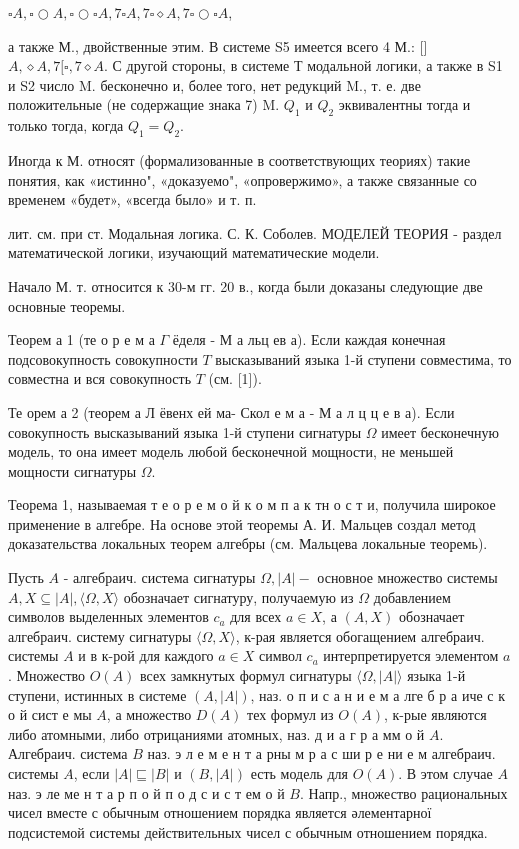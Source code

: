 \documentclass[10pt]{article}
\begin{document}
$\square A, \square \bigcirc A, \square \bigcirc \square A, 7 \square A, 7 \square \diamond A, 7 \square \bigcirc \square A$,



а также М., двойственные этим. В системе S5 имеется всего 4 М.: []$A, \diamond A, 7[\square, 7 \diamond A$. С другой стороны, в системе Т модальной логики, а также в S1 и S2 число M. бесконечно и, более того, нет редукций M., т. е. две положительные (не содержащие знака 7) M. $Q_{1}$ и $Q_{2}$ эквивалентны тогда и только тогда, когда $Q_{1}=Q_{2}$.



Иногда к М. относят (формализованные в соответствующих теориях) такие понятия, как «истинно", «доказуемо", «опровержимо», а также связанные со временем «будет», «всегда было» и т. п.



лит. см. при ст. Модальная логика. С. К. Соболев. МОДЕЛЕЙ ТЕОРИЯ - раздел математической логики, изучающий математические модели.



Начало М. т. относится к 30-м гг. 20 в., когда были доказаны следующие две основные теоремы.



Теорем а 1 (те о р е м а $\Gamma$ ёделя - М а льц ев а). Если каждая конечная подсовокупность совокупности $T$ высказываний языка 1-й ступени совместима, то совместна и вся совокупность $T$ (см. [1]).



Те орем а 2 (теорем а Л ёвенх ей ма- Скол е м а - М а л ц ц е в а). Если совокупность высказываний языка 1-й ступени сигнатуры $\Omega$ имеет бесконечную модель, то она имеет модель любой бесконечной мощности, не меньшей мощности сигнатуры $\Omega$.



Теорема 1, называемая т е о р е м о й к о м п а к тн о с т и, получила широкое применение в алгебре. На основе этой теоремы А. И. Мальцев создал метод доказательства локальных теорем алгебры (см. Мальцева локальные теоремь).



Пусть $A$ - алгебраич. система сигнатуры $\Omega,|A|-$ основное множество системы $A, X \subseteq|A|,\langle\Omega, X\rangle$ обозначает сигнатуру, получаемую из $\Omega$ добавлением символов выделенных элементов $c_{a}$ для всех $a \in X$, а $(A, X)$ обозначает алгебраич. систему сигнатуры $\langle\Omega, X\rangle$, к-рая является обогащением алгебраич. системы $A$ и в к-рой для каждого $a \in X$ символ $c_{a}$ интерпретируется элементом $a$. Множество $O(A)$ всех замкнутых формул сигнатуры $\langle\Omega,|A|\rangle$ языка 1-й ступени, истинных в системе $(A,|A|)$, наз. о п и с а н и е м а лге б р а иче с к о й сист е мы $A$, а множество $D(A)$ тех формул из $O(A)$, к-рые являются либо атомными, либо отрицаниями атомных, наз. д и а г р а мм о й $A$. Алгебраич. система $B$ наз. э л е м е н т а рны м р а с ши р е ни е м алгебраич. системы $A$, если $|A| \sqsubseteq|B|$ и $(B,|A|)$ есть модель для $O(A)$. В этом случае $A$ наз. э ле ме н т а р п о й п о д с и с т ем о й $B$. Напр., множество рациональных чисел вместе с обычным отношением порядка является әлементарної подсистемой системы действительных чисел с обычным отношением порядка.
\end{document}
